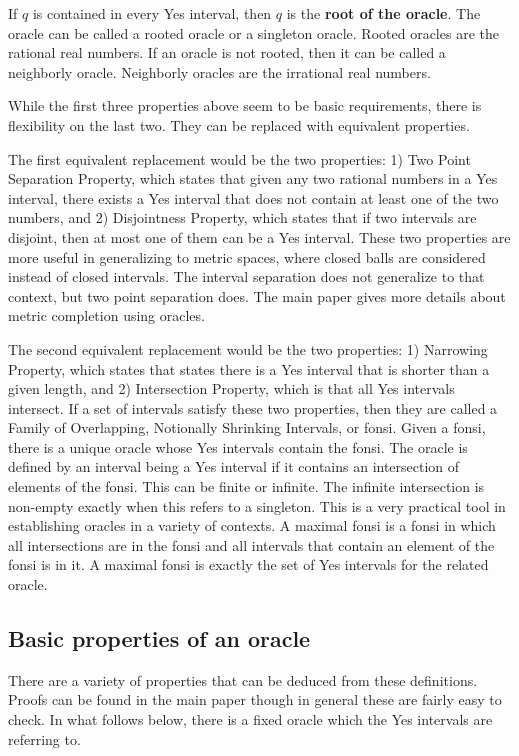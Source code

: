 \documentclass[12pt]{article}
\theoremstyle{remark}
\begin{document}
If $q$ is contained in every Yes interval, then $q$ is the \textbf{root of the oracle}.  The oracle can be called a rooted oracle or a singleton oracle. Rooted oracles are the rational real numbers. If an oracle is not rooted, then it can be called a neighborly oracle. Neighborly oracles are the irrational real numbers. 

While the first three properties above seem to be basic requirements, there is flexibility on the last two. They can be replaced with equivalent properties.

The first equivalent replacement would be the two properties: 1) Two Point Separation Property, which states that given any two rational numbers in a Yes interval, there exists a Yes interval that does not contain at least one of the two numbers, and 2) Disjointness Property, which states that if two intervals are disjoint, then at most one of them can be a Yes interval. These two properties are more useful in generalizing to metric spaces, where closed balls are considered instead of closed intervals. The interval separation does not generalize to that context, but two point separation does. The main paper gives more details about metric completion using oracles. 

The second equivalent replacement would be the two properties: 1) Narrowing Property, which states that states there is a Yes interval that is shorter than a given length, and 2) Intersection Property, which is that all Yes intervals intersect. If a set of intervals satisfy these two properties, then they are called a Family of Overlapping, Notionally Shrinking Intervals, or fonsi. Given a fonsi, there is a unique oracle whose Yes intervals contain the fonsi. The oracle is defined by an interval being a Yes interval if it contains an intersection of elements of the fonsi. This can be finite or infinite. The infinite intersection is non-empty exactly when this refers to a singleton. This is a very practical tool in establishing oracles in a variety of contexts. A maximal fonsi is a fonsi in which all intersections are in the fonsi and all intervals that contain an element of the fonsi is in it. A maximal fonsi is exactly the set of Yes intervals for the related oracle. 


\subsection{Basic properties of an oracle}

There are a variety of properties that can be deduced from these definitions. Proofs can be found in the main paper though in general these are fairly easy to check. In what follows below, there is a fixed oracle which the Yes intervals are referring to.
\end{document}
